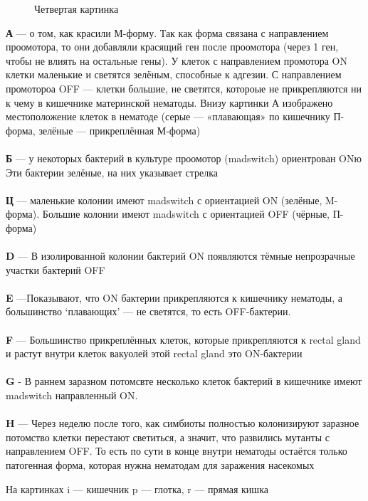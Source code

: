 \begin{figure}[H]\label{ul}
	\caption{Четвертая  картинка}
\end{figure} 

\textbf{А} — о том, как красили М-форму. Так как форма связана с направлением проомотора, то они добавляли красящий ген после проомотора (через 1 ген, чтобы не влиять на остальные гены).
У клеток с направлением промотора  ON клетки маленькие и светятся зелёным, способные к адгезии. С направлением промотороа OFF — клетки большие, не светятся, котороые не прикрепляются ни к чему в кишечнике материнской нематоды. Внизу картинки А изображено местоположение клеток в нематоде (серые — «плавающая» по кишечнику П-форма, зелёные — прикреплённая М-форма)
\\
\\
\textbf{Б} — у некоторых бактерий в культуре проомотор (madswitch) ориентрован ONю Эти бактерии зелёные, на них указывает стрелка
\\
\\
\textbf{Ц} — маленькие колонии имеют madswitch с ориентацией ON (зелёные, M-форма). Большие колонии имеют madswitch с ориентацией OFF (чёрные, П-форма)
\\
\\
\textbf{D} — В изолированной колонии бактерий ON появляются тёмные непрозрачные участки бактерий OFF
\\
\\
\textbf{E} —Показывают, что ON бактерии прикрепляются к кишечнику нематоды, а большинство ‘плавающих’ — не светятся, то есть OFF-бактерии. 
\\
\\
\textbf{F} — Большинство прикреплённых клеток, которые прикрепляются к rectal gland и растут внутри клеток вакуолей этой rectal gland это ON-бактерии
\\
\\
\textbf{G} - В раннем заразном потомсвте несколько клеток бактерий в кишечнике имеют madswitch направленный ON.
\\
\\
\textbf{H} — Через неделю после того, как симбиоты полностью колонизируют заразное потомство клетки перестают светиться, а значит, что развились мутанты с направлением OFF. То есть по сути в конце внутри нематоды остаётся только патогенная форма, которая нужна нематодам для заражения насекомых

На картинках i — кишечник p — глотка, r — прямая кишка